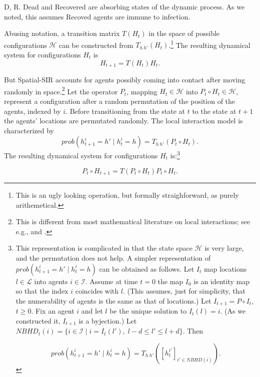 \documentclass[english,11pt]{article}
\begin{document}
D, R. Dead and Recovered are absorbing states of the dynamic process. As we noted, this assumes Recoved agents are immune to infection. \newline 

Abusing notation, a transition matrix $T( H_t)$ in the space of possible configurations $\mathcal{H}$ can be constructed from $T_{h \: h'} ( H_t)$.\footnote{This is an ugly looking operation, but formally straighforward, as purely arithemetical.} The resulting dynamical system for configurations $H_t$ is 
$$H_{t+1} =T( H_t)H_t.$$

But Spatial-SIR accounts for  agents possibly coming  into contact after moving randomly in space.\footnote{This is different from most mathematical literature on local interactions; see e.g., \cite{kindermann1980american} and \cite{liggett2012interacting}.} 
Let the operator $P_t$, mapping $H_t \in \mathcal{H}$ into $P_t \circ H_t \in \mathcal{H}$, represent a configuration after a random permutation of the position of the agents, indexed by $i$. Before transitioning from the state at $t$ to the state at $t+1$ the agents' locations are permutated randomly. The local interaction model is characterized by 
$$ prob(h^i_{t+1}=h' \mid h^i_t=h)= T_{h \: h'} ( P_t \circ H_t). $$  
The resulting dynamical system for configurations $H_t$ is:\footnote{This representation is complicated in that the state space $\mathcal{H}$ is very large, and the permutation does not help. A simpler representation of $ prob(h^i_{t+1}=h' \mid h^i_t=h)$ can be obtained as follows. Let $I_t$ map locations $l \in \mathcal{L}$ into agents $i \in \mathcal{I}$. Assume at time $t=0$ the map $I_0$ is an identity map so that the index $i$ coincides with $l$. (This assumes, just for simplicity, that  the numerability of agents is the same as that of locations.) Let $I_{t+1}=P \circ I_t$, $t\geq 0$.  Fix an agent $i$ and let $l$ be the unique solution to  $I_t(l)=i$. (As we constructed it, $I_{t+1}$ is a byjection.) Let $NBHD_t(i)=\{ i \in \mathcal{I} \mid i=I_t(l'), \; l-d \leq l'\leq l+d\}$. Then 

$$ prob(h^i_{t+1}=h' \mid h^i_t=h)= T_{h \: h'} ( [h_t^{i'}]_{i' \in NBHD(i)} ). $$  } 

\begin{equation} P_t \circ H_{t+1} =T(P_t \circ H_t)P_t \circ H_t. \label{locint} \end{equation}  
 
\end{document}
